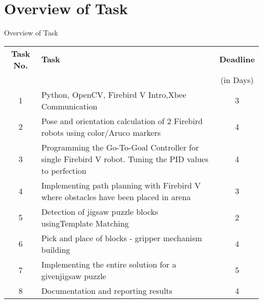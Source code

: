 \documentclass[10pt, a4paper]{beamer}
\begin{document}
\section{Overview of Task}
\begin{frame}{Overview of Task}
	\begin{tabular}{| c | p{18 em} | c |}\hline
	\textbf{Task No.} & \hspace{7em}\textbf{Task} & \textbf{Deadline} \\
	& & (in Days)\\\hline
	1 &\small{ Python, OpenCV, Firebird V Intro,\hspace{5 em}Xbee Communication} & 3 \\\hline
	2 &\small{ Pose and orientation calculation of 2 Firebird robots using color/Aruco markers }& 4\\\hline
	3 &\small{ Programming the Go-To-Goal Controller for single Firebird V robot. Tuning the PID\hspace{3 em} values to perfection }& 4\\\hline
	4 &\small{ Implementing path planning with Firebird V where obstacles have been placed in arena }& 3\\\hline
	5 &\small{ Detection of jigsaw puzzle blocks using\hspace{3 em}Template Matching} & 2\\\hline
	6 &\small{ Pick and place of blocks - gripper mechanism building }& 4\\\hline
	7 &\small{ Implementing the entire solution for a given\hspace{3 em}jigsaw puzzle }& 5\\\hline
	8 &\small{ Documentation and reporting results }& 4\\\hline
	\end{tabular}
	
\end{frame}
\end{document}
